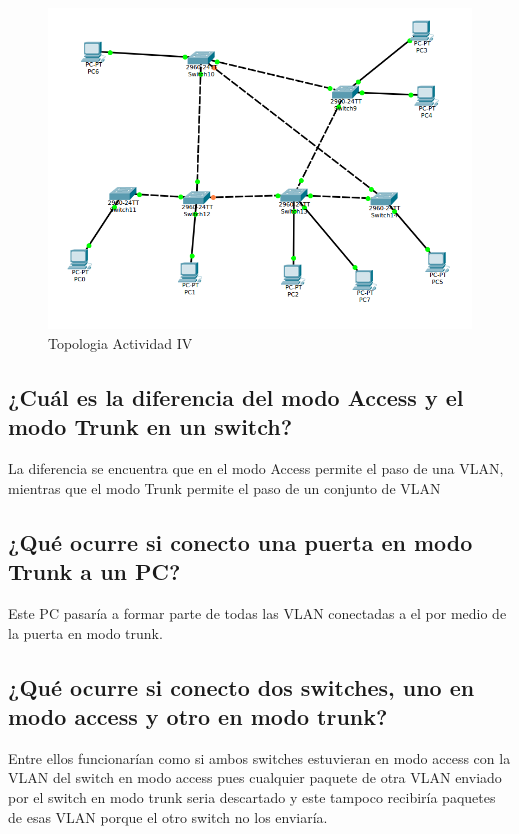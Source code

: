 ﻿\documentclass[spanish]{udpreport}
\begin{document}
\begin{figure}[H]
	\caption{Topologia Actividad IV}
	\label{fig:Figura 2.4}
	\centering
	\includegraphics[scale=.6, bb=0 0 0 0]{imagenes/A4e.png}
	\linebreak
\end{figure}

\subsection{¿Cuál es la diferencia del modo Access y el modo Trunk en un switch?}
La diferencia se encuentra que en el modo Access permite el paso de una VLAN, mientras que el modo Trunk permite el paso de un conjunto de VLAN

\subsection{¿Qué ocurre si conecto una puerta en modo Trunk a un PC?}
Este PC pasaría a formar parte de todas las VLAN conectadas a el por medio de la puerta en modo trunk.

\subsection{¿Qué ocurre si conecto dos switches, uno en modo access y otro en modo trunk?}
Entre ellos funcionarían como si ambos switches estuvieran en modo access con la VLAN del switch en modo access pues cualquier paquete de otra VLAN enviado por el switch en modo trunk seria descartado y este tampoco recibiría paquetes de esas VLAN porque el otro switch no los enviaría.
\end{document}
